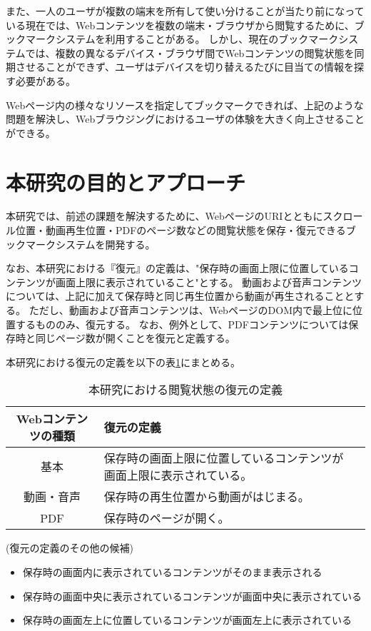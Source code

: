 また、一人のユーザが複数の端末を所有して使い分けることが当たり前になっている現在では、Webコンテンツを複数の端末・ブラウザから閲覧するために、ブックマークシステムを利用することがある。
しかし、現在のブックマークシステムでは、複数の異なるデバイス・ブラウザ間でWebコンテンツの閲覧状態を同期させることができず、ユーザはデバイスを切り替えるたびに目当ての情報を探す必要がある。

Webページ内の様々なリソースを指定してブックマークできれば、上記のような問題を解決し、Webブラウジングにおけるユーザの体験を大きく向上させることができる。

\section{本研究の目的とアプローチ}
本研究では、前述の課題を解決するために、WebページのURIとともにスクロール位置・動画再生位置・PDFのページ数などの閲覧状態を保存・復元できるブックマークシステムを開発する。

なお、本研究における『復元』の定義は、"保存時の画面上限に位置しているコンテンツが画面上限に表示されていること"とする。
動画および音声コンテンツについては、上記に加えて保存時と同じ再生位置から動画が再生されることとする。
ただし、動画および音声コンテンツは、WebページのDOM内で最上位に位置するもののみ、復元する。
なお、例外として、PDFコンテンツについては保存時と同じページ数が開くことを復元と定義する。

本研究における復元の定義を以下の表\ref{tb:restore-definition}にまとめる。

\begin{table}[htbp]
  \begin{center}
    \caption{本研究における閲覧状態の復元の定義}
    \label{tb:restore-definition}
    \begin{tabular}{|c|l|l|}
      \hline
      Webコンテンツの種類 & 復元の定義 \\\hline\hline
      基本 & 保存時の画面上限に位置しているコンテンツが画面上限に表示されている。 \\\hline
      動画・音声 & 保存時の再生位置から動画がはじまる。 \\\hline
      PDF & 保存時のページが開く。 \\\hline
    \end{tabular}
  \end{center}
\end{table}

(復元の定義のその他の候補)

\begin{itemize}
  \item 保存時の画面内に表示されているコンテンツがそのまま表示される
  \item 保存時の画面中央に表示されているコンテンツが画面中央に表示されている
  \item 保存時の画面左上に位置しているコンテンツが画面左上に表示されている
\end{itemize}

